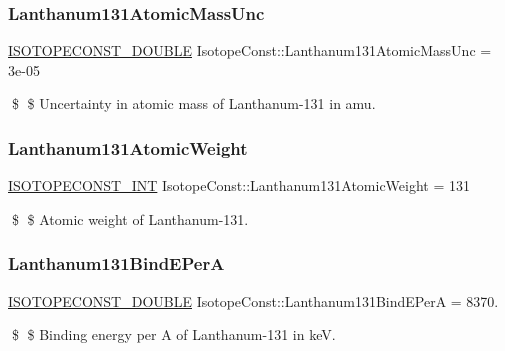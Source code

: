 \subsubsection{\texorpdfstring{Lanthanum131\+Atomic\+Mass\+Unc}{Lanthanum131AtomicMassUnc}}
{\footnotesize\ttfamily \mbox{\hyperlink{group___isotope_const-_macros_ga8f45a7272ce02c0b4c65c44636ed719a}{I\+S\+O\+T\+O\+P\+E\+C\+O\+N\+S\+T\+\_\+\+D\+O\+U\+B\+LE}} Isotope\+Const\+::\+Lanthanum131\+Atomic\+Mass\+Unc = 3e-\/05}

\$ \$ Uncertainty in atomic mass of Lanthanum-\/131 in amu. \mbox{\label{group___isotope_const-_lanthanum-_la131_gaa832c4458611d092c620b17cc1eae20a}} 
\subsubsection{\texorpdfstring{Lanthanum131\+Atomic\+Weight}{Lanthanum131AtomicWeight}}
{\footnotesize\ttfamily \mbox{\hyperlink{group___isotope_const-_macros_ga5f18360b3e99483a35c32d789e62621c}{I\+S\+O\+T\+O\+P\+E\+C\+O\+N\+S\+T\+\_\+\+I\+NT}} Isotope\+Const\+::\+Lanthanum131\+Atomic\+Weight = 131}

\$ \$ Atomic weight of Lanthanum-\/131. \mbox{\label{group___isotope_const-_lanthanum-_la131_ga96be86a11dc90d0ed0dd0cb68741fbc4}} 
\subsubsection{\texorpdfstring{Lanthanum131\+Bind\+E\+PerA}{Lanthanum131BindEPerA}}
{\footnotesize\ttfamily \mbox{\hyperlink{group___isotope_const-_macros_ga8f45a7272ce02c0b4c65c44636ed719a}{I\+S\+O\+T\+O\+P\+E\+C\+O\+N\+S\+T\+\_\+\+D\+O\+U\+B\+LE}} Isotope\+Const\+::\+Lanthanum131\+Bind\+E\+PerA = 8370.}

\$ \$ Binding energy per A of Lanthanum-\/131 in keV. \mbox{\label{group___isotope_const-_lanthanum-_la131_ga14048046dab963fdaba69d4e0df351bd}} 
